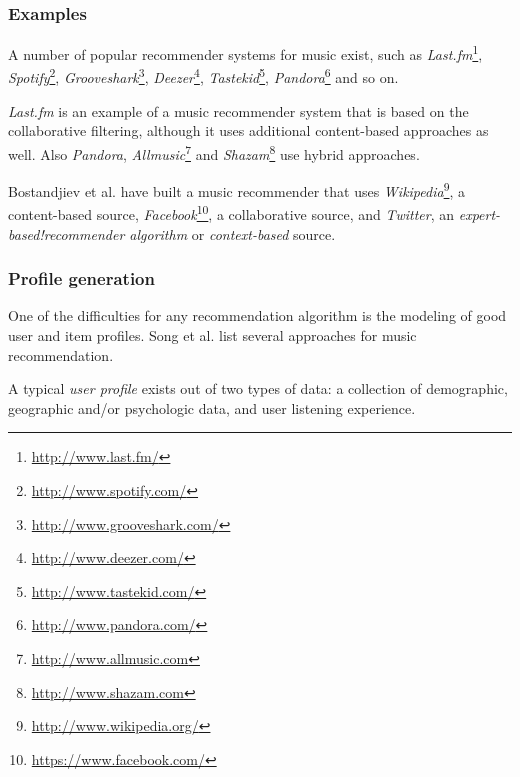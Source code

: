 
\subsubsection{Examples}

A number of popular recommender systems for music exist, such as \emph{Last.fm}\footnote{\url{http://www.last.fm/}}, \emph{Spotify}\footnote{\url{http://www.spotify.com/}}, \emph{Grooveshark}\footnote{\url{http://www.grooveshark.com/}}, \emph{Deezer}\footnote{\url{http://www.deezer.com/}}, \emph{Tastekid}\footnote{\url{http://www.tastekid.com/}}, \emph{Pandora}\footnote{\url{http://www.pandora.com/}} and so on.

\emph{Last.fm} is an example of a music recommender system that is based on the collaborative filtering\cite{levy:2010}, although it uses additional content-based approaches as well\cite{song:2012}. Also \emph{Pandora}, \emph{Allmusic}\footnote{\url{http://www.allmusic.com}} and \emph{Shazam}\footnote{\url{http://www.shazam.com}} use hybrid approaches\cite{song:2012}.

Bostandjiev et al. \cite{bostandjiev:2012} have built a music recommender that uses \emph{Wikipedia}\footnote{\url{http://www.wikipedia.org/}}, a content-based source, \emph{Facebook}\footnote{\url{https://www.facebook.com/}}, a collaborative source, and \emph{Twitter}, an \emph{expert-based!recommender algorithm} or \emph{context-based} source.

\subsubsection{Profile generation}

One of the difficulties for any recommendation algorithm is the modeling of good user and item profiles. Song et al. \cite{song:2012} list several approaches for music recommendation.

A typical \emph{user profile} exists out of two types of data: a collection of demographic, geographic and/or psychologic data, and user listening experience\cite{song:2012}.

